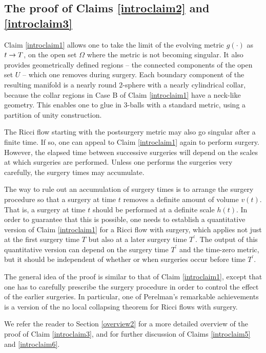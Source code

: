 \subsection{The proof of Claims \ref{introclaim2} and \ref{introclaim3}}
Claim \ref{introclaim1} allows one to take the limit of the evolving metric
$g(\cdot)$ as $t\rightarrow T$, on the open set $\Omega$ where the metric is not
becoming singular.  It also provides geometrically defined regions -- the
connected components of the open set $U$ -- which one removes during surgery.
Each boundary component of the resulting manifold is
a nearly round $2$-sphere with a nearly cylindrical collar,
because the collar regions in Case B of Claim \ref{introclaim1} have a neck-like
geometry.  This enables one to glue in $3$-balls with a standard
metric, using a partition of unity  construction.


The Ricci flow starting with the postsurgery metric may also go singular after
a finite time. If so, one can appeal to Claim \ref{introclaim1} again to perform
surgery.
However, the elapsed time between successive surgeries will depend on
the scales at which surgeries are performed. Unless one performs
the surgeries very carefully, the surgery times may accumulate.

The way to rule out an accumulation of surgery times is to
arrange the surgery procedure so that a surgery at time $t$ removes a definite amount
of volume $v(t)$.  That is, a surgery at time $t$ should be performed at a
definite scale $h(t)$. In order to guarantee that this is possible, one needs to
establish a
quantitative version of Claim \ref{introclaim1} for a Ricci flow with surgery,
which applies not just at the first surgery time $T$ but also at a later
surgery
time $T^\prime$. The output of this quantitative version can depend on
the surgery time $T^\prime$
and the time-zero
metric, but it should be independent of whether or when surgeries occur
before time $T^\prime$.

The
general idea of the proof is similar to that of Claim \ref{introclaim1},
except that one has to carefully prescribe the surgery procedure in order
to control the effect of the earlier
surgeries. In particular, one of Perelman's
remarkable achievements is  a version of the no local collapsing theorem
for Ricci flows with surgery.


We refer the  reader to Section \ref{overview2} for a
more detailed overview of the proof of Claim \ref{introclaim3}, and for
further discussion of Claims \ref{introclaim5} and \ref{introclaim6}.



